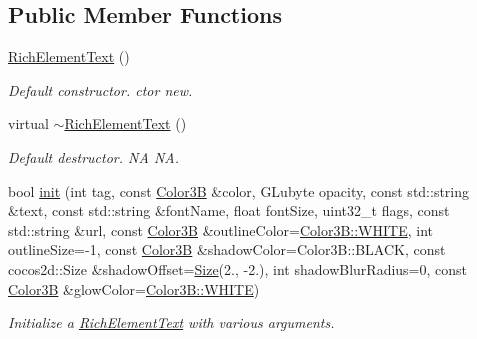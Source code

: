 \subsection*{Public Member Functions}
\begin{DoxyCompactItemize}
\item 
\mbox{\label{classui_1_1RichElementText_af1893a4f982b5fdc74c8d54726dff8dc}} 
\hyperlink{classui_1_1RichElementText_af1893a4f982b5fdc74c8d54726dff8dc}{Rich\+Element\+Text} ()
\begin{DoxyCompactList}\small\item\em Default constructor.  ctor  new. \end{DoxyCompactList}\item 
\mbox{\label{classui_1_1RichElementText_aa42ce1649325a0e8e0ef4ec04337910f}} 
virtual \hyperlink{classui_1_1RichElementText_aa42ce1649325a0e8e0ef4ec04337910f}{$\sim$\+Rich\+Element\+Text} ()
\begin{DoxyCompactList}\small\item\em Default destructor.  NA  NA. \end{DoxyCompactList}\item 
bool \hyperlink{classui_1_1RichElementText_aaa0fca748c6e6b0093724ca8dd0fc824}{init} (int tag, const \hyperlink{structColor3B}{Color3B} \&color, G\+Lubyte opacity, const std\+::string \&text, const std\+::string \&font\+Name, float font\+Size, uint32\+\_\+t flags, const std\+::string \&url, const \hyperlink{structColor3B}{Color3B} \&outline\+Color=\hyperlink{structColor3B_adf57cb86ca15f434b29215ad471cdc35}{Color3\+B\+::\+W\+H\+I\+TE}, int outline\+Size=-\/1, const \hyperlink{structColor3B}{Color3B} \&shadow\+Color=Color3\+B\+::\+B\+L\+A\+CK, const cocos2d\+::\+Size \&shadow\+Offset=\hyperlink{classSize}{Size}(2., -\/2.), int shadow\+Blur\+Radius=0, const \hyperlink{structColor3B}{Color3B} \&glow\+Color=\hyperlink{structColor3B_adf57cb86ca15f434b29215ad471cdc35}{Color3\+B\+::\+W\+H\+I\+TE})
\begin{DoxyCompactList}\small\item\em Initialize a \hyperlink{classui_1_1RichElementText}{Rich\+Element\+Text} with various arguments. \end{DoxyCompactList}\item 
\mbox{\label{classui_1_1RichElementText_af1893a4f982b5fdc74c8d54726dff8dc}} 

\end{DoxyCompactItemize}
